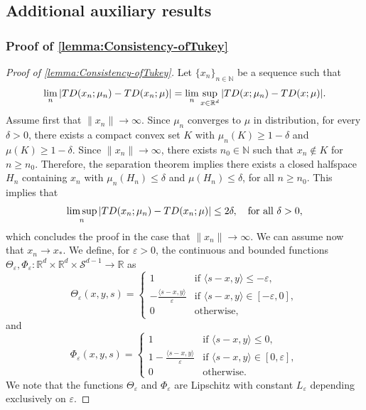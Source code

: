\documentclass[11pt]{article}
\newcommand{\R}{\mathbb{R}}
\newcommand{\N}{\mathbb{N}}
\newcommand{\eps}{\varepsilon}
\theoremstyle{plain}
\theoremstyle{definition}
\begin{document}
\subsection{Additional auxiliary results}
%
\subsubsection{Proof of \autoref{lemma:Consistency-ofTukey}}\label{Section:Proof-of-lemma-Tukey}



 { \begin{proof}[Proof of \autoref{lemma:Consistency-ofTukey}]
 Let $\{x_n\}_{n\in \N}$ be a sequence such that 
 $$  \lim_n |{\rm TD}(x_n; \mu_n) - {\rm TD}(x_n; \mu)|= \lim_n\sup_{x\in \R^d}|{\rm TD}(x; \mu_n) - {\rm TD}(x; \mu)|.$$
 Assume first that $\|x_n\|\to \infty$. Since $\mu_n$ converges to $\mu$ in distribution, for every $\delta>0$, there exists  a compact convex set $K$ with $ \mu_n(K)\geq 1-\delta $ and $ \mu(K)\geq 1-\delta$. Since $\|x_n\|\to \infty$, there exists $n_0\in \N$ such that  $x_n\notin K$ for $n\geq n_0$. Therefore, the separation theorem \cite[Theorem 11.2]{Rockafellar.70} implies there exists a closed halfspace $H_n$ containing $x_n$ with $\mu_n(H_n)\leq  \delta$ and  $\mu(H_n)\leq \delta$,  for all $n\geq n_0$. This implies that 
 $$ \limsup_n |{\rm TD}(x_n; \mu_n) - {\rm TD}(x_n; \mu) | \leq 2\delta, \quad \text{for all }\delta>0,$$
%
which concludes the proof in the case that $\|x_n\|\to \infty$. We can assume now that $x_n \to x_*$. 
     We define, for $\eps>0$, the continuous and bounded functions $\Theta_\eps, \Phi_\eps:\R^d\times \R^d \times\mathcal{S}^{d-1}\to \R $ as  $$ \Theta_\eps (x,y,s)= \begin{cases}
         1 & \text{if } \langle  s-x, y\rangle\leq -\eps, \\
       -\frac{\langle  s-x, y\rangle}{\eps}  & \text{if } \langle  s-x, y\rangle \in [-\eps,0],\\
         0 &  \text{otherwise},
     \end{cases}  $$
     and 
     $$ \Phi_\eps (x,y,s)= \begin{cases}
         1 & \text{if } \langle  s-x, y\rangle\leq 0, \\
       1-\frac{\langle  s-x, y\rangle}{\eps}  & \text{if } \langle  s-x, y\rangle \in [0,\eps],\\
         0 &  \text{otherwise}.
     \end{cases}  $$
We note that the functions $\Theta_\eps $ and $ \Phi_\eps$ are Lipschitz with constant $L_\eps$ depending exclusively on $\eps$.  

\end{proof}}
\end{document}
